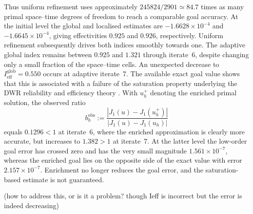 Thus uniform refinement uses approximately $245824/2901\simeq84.7$ times as many primal space--time degrees of freedom to reach a comparable goal accuracy. 
At the initial level the global and localised estimates are $-1.6628\times10^{-4}$ and $-1.6645\times10^{-4}$, giving effectivities $0.925$ and $0.926$, respectively. Uniform refinement subsequently drives both indices smoothly towards one. The adaptive global index remains between $0.925$ and $1.321$ through iterate~6, despite changing only a small fraction of the space--time cells.
An unexpected decrease to $I_{\mathrm{eff}}^{\mathrm{glob}}=0.550$ occurs at adaptive iterate~7. The available exact goal value shows that this is associated with a failure of the saturation property underlying the DWR reliability and efficiency theory \cite{ENDTMAYER202419}. With $u_h^+$ denoting the enriched primal solution, the observed ratio 
\begin{equation*}
  b_h^{\mathrm{obs}}
  :=\frac{|J_1(u)-J_1(u_h^+)|}{|J_1(u)-J_1(u_h)|}
  \label{eq:lshape-observed-saturation}
\end{equation*}
equals $0.1296<1$ at iterate~6, where the enriched approximation is clearly more accurate, but increases to $1.382>1$ at iterate~7. At the latter level the low-order goal error has crossed zero and has the very small magnitude $1.561\times10^{-7}$, whereas the enriched goal lies on the opposite side of the exact value with error $2.157\times10^{-7}$. Enrichment no longer reduces the goal error, and the saturation-based estimate is not guaranteed.

(how to address this, or is it a problem? though Ieff is incorrect but the error is indeed decreasing)


